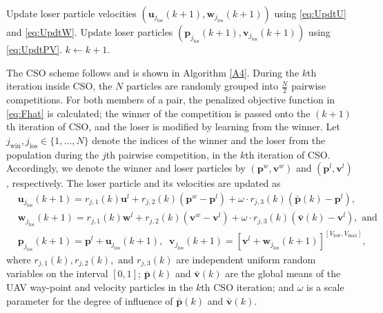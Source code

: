 \documentclass[12pt, draftcls, onecolumn]{IEEEtran}
\theoremstyle{plain}
\theoremstyle{definition}
\theoremstyle{remark}
\DeclareMathOperator*{\argmin}{arg\,min}
\begin{document}
\begin{algorithm}[t]
\begin{algorithmic}[1]
    			\vspace{.2cm}
    			\State Update loser particle velocities $(\mathbf{u}_{j_{\mathrm{los}}}(k{+}1),\mathbf{w}_{j_{\mathrm{los}}}(k{+}1))$ using \eqref{eq:UpdtU} and \eqref{eq:UpdtW}.
    			\vspace{.2cm}
    			\State Update loser particles $(\mathbf{p}_{j_{\mathrm{los}}}(k{+}1),\mathbf{v}_{j_{\mathrm{los}}}(k{+}1))$ using \eqref{eq:UpdtPV}.
    			\vspace{.2cm}
    		\EndFor
    		\vspace{.2cm}
    		\State $k{\gets}k{+}1$.
    		\vspace{.2cm}
    	\vspace{.2cm}
    	\newline
    	\Return{$(\mathbf{p}^{*},\mathbf{v}^{*}){=}\argmin\{\hat{f}(\mathbf{p}_{i}(k),\mathbf{v}_{i}(k)),{\forall}i{=}1,{\dots},N\}$}
    \end{algorithmic}
\end{algorithm}

The CSO scheme follows \cite{CSO} and is shown in Algorithm \ref{A4}. During the $k$th iteration inside CSO, the $N$ particles are randomly grouped into $\frac{N}{2}$ pairwise competitions. For both members of a pair, the penalized objective function in \eqref{eq:Fhat} is calculated; the winner of the competition is passed onto the $(k{+}1)$th iteration of CSO, and the loser is modified by learning from the winner. Let $j_{\mathrm{win}}, j_{\mathrm{los}}{\in}\{1,{\dots},N\}$ denote the indices of the winner and the loser from the population during the $j$th pairwise competition, in the $k$th iteration of CSO. Accordingly, we denote the winner and loser particles by $(\mathbf{p}^{w},\mathbf{v}^{w})$ and $(\mathbf{p}^{l},\mathbf{v}^{l})$, respectively. The loser particle and its velocities are updated as
\begin{align}
	&\mathbf u_{j_{\mathrm{los}}} (k+1) = r_{j,1} (k) \mathbf u^l + r_{j,2}(k) \left( \mathbf p^w - \mathbf p^l \right) + \omega \cdot r_{j,3}(k) \left( \bar{\mathbf p}(k) - \mathbf p^l \right),\label{eq:UpdtU}\\
	&\mathbf w_{j_{\mathrm{los}}} (k+1) = r_{j,1} (k) \mathbf w^l + r_{j,2}(k) \left( \mathbf v^w - \mathbf v^l \right) + \omega \cdot r_{j,3}(k) \left( \bar{\mathbf v}(k) - \mathbf v^l \right),\text{ and }\label{eq:UpdtW}\\
	&\mathbf p_{j_{\mathrm{los}}} (k+1) = \mathbf p^l + \mathbf u_{j_{\mathrm{los}}} (k+1), \;\; \mathbf v_{j_{\mathrm{los}}} (k+1) = \left[ \mathbf v^l + \mathbf w_{j_{\mathrm{los}}} (k+1) \right]^{[V_{\mathrm{low}},V_{\mathrm{max}}]},\label{eq:UpdtPV}
\end{align}
where $r_{j,1}(k),r_{j,2}(k),\text{ and }r_{j,3}(k)$ are independent uniform random variables on the interval $[0,1]$; $\bar{\mathbf{p}}(k)$ and $\bar{\mathbf{v}}(k)$ are the global means of the UAV way-point and velocity particles in the $k$th CSO iteration; and $\omega$ is a scale parameter for the degree of influence of $\bar{\mathbf{p}}(k)$ and $\bar{\mathbf{v}}(k)$.
\end{document}
